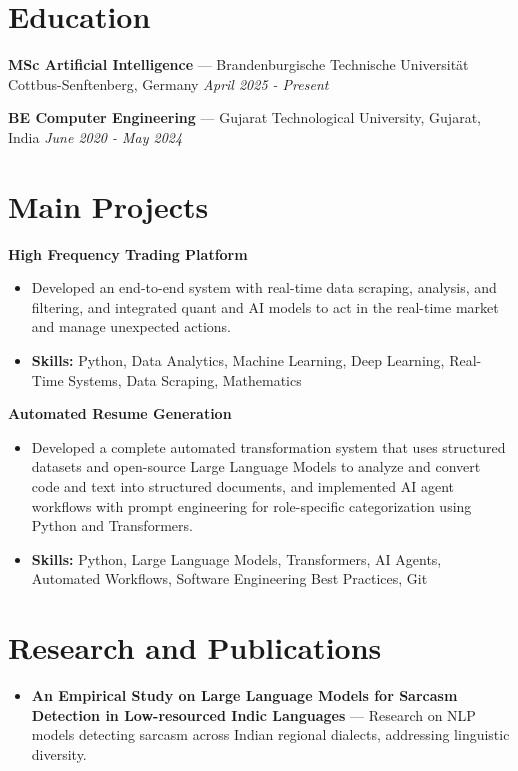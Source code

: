 \documentclass[a4paper,10pt]{article}
\begin{document}
\section*{Education}
\textbf{MSc Artificial Intelligence} — Brandenburgische Technische Universität Cottbus-Senftenberg, Germany \hfill \textit{April 2025 - Present}\par
\vspace{1.5pt}
\textbf{BE Computer Engineering} — Gujarat Technological University, Gujarat, India \hfill \textit{June 2020 - May 2024}\par

\section*{Main Projects}
\textbf{High Frequency Trading Platform}\par
\vspace{1pt}
\begin{itemize}
  \item Developed an end-to-end system with real-time data scraping, analysis, and filtering, and integrated quant and AI models to act in the real-time market and manage unexpected actions.
  \item \textbf{Skills:} Python, Data Analytics, Machine Learning, Deep Learning, Real-Time Systems, Data Scraping, Mathematics
\end{itemize}
\vspace{3pt}
\textbf{Automated Resume Generation}\par
\vspace{1pt}
\begin{itemize}
  \item Developed a complete automated transformation system that uses structured datasets and open-source Large Language Models to analyze and convert code and text into structured documents, and implemented AI agent workflows with prompt engineering for role-specific categorization using Python and Transformers.
  \item \textbf{Skills:} Python, Large Language Models, Transformers, AI Agents, Automated Workflows, Software Engineering Best Practices, Git
\end{itemize}

\section*{Research and Publications}
\begin{itemize}
\item \textbf{An Empirical Study on Large Language Models for Sarcasm Detection in Low-resourced Indic Languages} — Research on NLP models detecting sarcasm across Indian regional dialects, addressing linguistic diversity.
\end{itemize}
\end{document}
